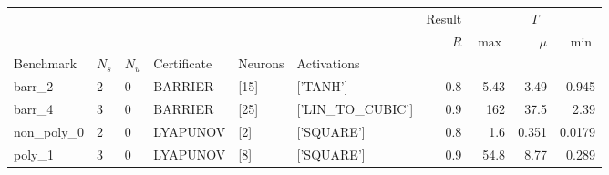 \begin{tabular}{llllllrrrr}
    \toprule
                 &       &       &             &         &                    & Result & \multicolumn{3}{c}{$T$}                  \\
                 &       &       &             &         &                    & $R$    & $\max$                  & $\mu$ & $\min$ \\
    Benchmark    & $N_s$ & $N_u$ & Certificate & Neurons & Activations        &        &                         &       &        \\
    \midrule
    barr\_2      & 2     & 0     & BARRIER     & [15]    & ['TANH']           & 0.8    & 5.43                    & 3.49  & 0.945  \\
    barr\_4      & 3     & 0     & BARRIER     & [25]    & ['LIN\_TO\_CUBIC'] & 0.9    & 162                     & 37.5  & 2.39   \\
    non\_poly\_0 & 2     & 0     & LYAPUNOV    & [2]     & ['SQUARE']         & 0.8    & 1.6                     & 0.351 & 0.0179 \\
    poly\_1      & 3     & 0     & LYAPUNOV    & [8]     & ['SQUARE']         & 0.9    & 54.8                    & 8.77  & 0.289  \\
    \bottomrule
\end{tabular}
